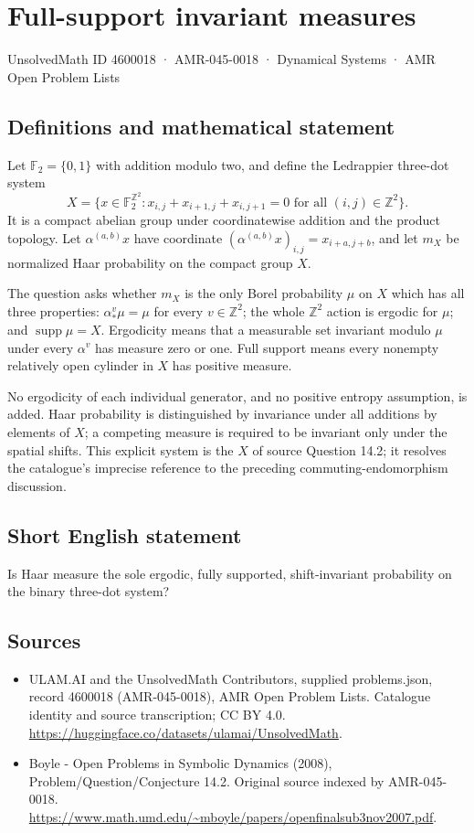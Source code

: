\documentclass[11pt,a4paper]{article}
\begin{document}
\section*{Full-support invariant measures}\label{4600018}
{\small UnsolvedMath ID 4600018 · AMR-045-0018 · Dynamical Systems · AMR Open Problem Lists}
\subsection{Definitions and mathematical statement}
Let $\mathbb F_2=\{0,1\}$ with addition modulo two, and define the
Ledrappier three-dot system
\[
 X=\{x\in\mathbb F_2^{\mathbb Z^2}:
       x_{i,j}+x_{i+1,j}+x_{i,j+1}=0
       \text{ for all }(i,j)\in\mathbb Z^2\}.
\]
It is a compact abelian group under coordinatewise addition and the
product topology. Let $\alpha^{(a,b)}x$ have coordinate
$(\alpha^{(a,b)}x)_{i,j}=x_{i+a,j+b}$, and let $m_X$ be normalized Haar
probability on the compact group $X$.

The question asks whether $m_X$ is the only Borel probability $\mu$ on
$X$ which has all three properties: $\alpha^v_*\mu=\mu$ for every
$v\in\mathbb Z^2$; the whole $\mathbb Z^2$ action is ergodic for $\mu$;
and $\operatorname{supp}\mu=X$. Ergodicity means that a measurable set
invariant modulo $\mu$ under every $\alpha^v$ has measure zero or one.
Full support means every nonempty relatively open cylinder in $X$ has
positive measure.

No ergodicity of each individual generator, and no positive entropy
assumption, is added. Haar probability is distinguished by invariance
under all additions by elements of $X$; a competing measure is required
to be invariant only under the spatial shifts. This explicit system is
the $X$ of source Question 14.2; it resolves the catalogue's imprecise
reference to the preceding commuting-endomorphism discussion.
\subsection{Short English statement}
Is Haar measure the sole ergodic, fully supported, shift-invariant probability on the binary three-dot system?
\subsection{Sources}
\begin{itemize}
\item[S1] ULAM.AI and the UnsolvedMath Contributors, supplied problems.json, record 4600018 (AMR-045-0018), AMR Open Problem Lists. Catalogue identity and source transcription; CC BY 4.0.
\url{https://huggingface.co/datasets/ulamai/UnsolvedMath}.
\item[S2] Boyle - Open Problems in Symbolic Dynamics (2008), Problem/Question/Conjecture 14.2. Original source indexed by AMR-045-0018.
\url{https://www.math.umd.edu/~mboyle/papers/openfinalsub3nov2007.pdf}.
\end{itemize}
\end{document}
